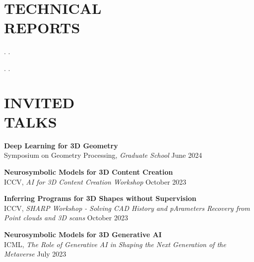 \documentclass[line,margin]{res}
\begin{document}
\begin{resume}
\section {TECHNICAL\\REPORTS}

. 
.

. 
.




\section{INVITED\\TALKS}

\newcommand{\talktitle}[1]{
	\textbf{#1}
}
\newcommand{\talk}[3]{
	#1, \emph{#2} \hfill #3
}

\talktitle{Deep Learning for 3D Geometry}\\
\talk
	{Symposium on Geometry Processing}
	{Graduate School}
	{June 2024}

\talktitle{Neurosymbolic Models for 3D Content Creation}\\
\talk
	{ICCV}
	{AI for 3D Content Creation Workshop}
	{October 2023}

\talktitle{Inferring Programs for 3D Shapes without Supervision}\\
\talk
	{ICCV}
	{SHARP Workshop - Solving CAD History and pArameters Recovery from Point clouds and 3D scans}
	{October 2023}

\talktitle{Neurosymbolic Models for 3D Generative AI}\\
\talk
	{ICML}
	{The Role of Generative AI in Shaping the Next Generation of the Metaverse}
	{July 2023}


\end{resume}
\end{document}
